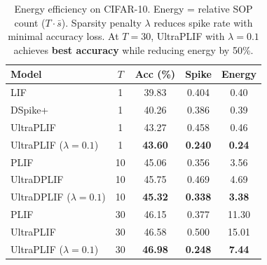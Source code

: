 \documentclass{article}
\theoremstyle{plain}
\theoremstyle{definition}
\theoremstyle{remark}
\begin{document}
\begin{table}[t]
\caption{Energy efficiency on CIFAR-10. Energy = relative SOP count ($T \cdot \bar{s}$). Sparsity penalty $\lambda$ reduces spike rate with minimal accuracy loss. At $T{=}30$, UltraPLIF with $\lambda{=}0.1$ achieves \textbf{best accuracy} while reducing energy by 50\%.}
\label{tab:efficiency}
\vskip 0.1in
\begin{center}
\begin{small}
\begin{tabular}{lcccc}
\toprule
Model & $T$ & Acc (\%) & Spike & Energy \\
\midrule
LIF        & 1 & 39.83 & 0.404 & 0.40 \\
DSpike+    & 1 & 40.26 & 0.386 & 0.39 \\
UltraPLIF   & 1 & 43.27 & 0.458 & 0.46 \\
UltraPLIF ($\lambda{=}0.1$) & 1 & \textbf{43.60} & \textbf{0.240} & \textbf{0.24} \\
\midrule
PLIF       & 10 & 45.06 & 0.356 & 3.56 \\
UltraDPLIF  & 10 & 45.75 & 0.469 & 4.69 \\
UltraDPLIF ($\lambda{=}0.1$) & 10 & \textbf{45.32} & \textbf{0.338} & \textbf{3.38} \\
\midrule
PLIF       & 30 & 46.15 & 0.377 & 11.30 \\
UltraPLIF  & 30 & 46.58 & 0.500 & 15.01 \\
UltraPLIF ($\lambda{=}0.1$) & 30 & \textbf{46.98} & \textbf{0.248} & \textbf{7.44} \\
\bottomrule
\end{tabular}
\end{small}
\end{center}
\vskip -0.1in
\end{table}
\end{document}
